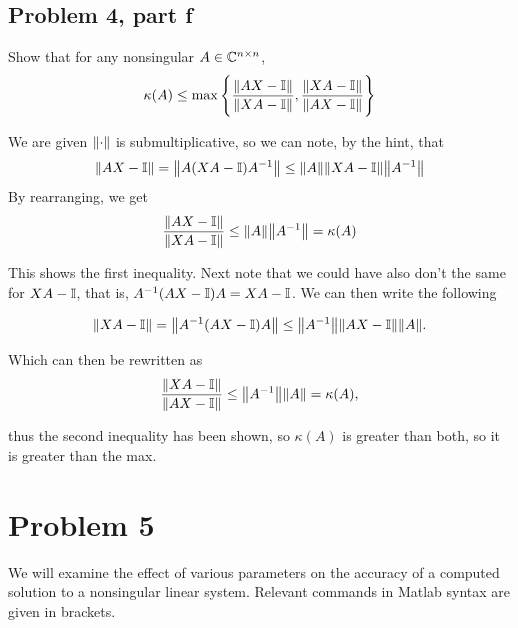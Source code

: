 \newpage
 \subsection{Problem 4, part f}
 Show that for any nonsingular $A \in \mathbb{C}^{n\times n}$, 
 \[
 \kappa(A) \leq \max \Bigg\{ \frac{\norm{AX - \mathbb{I}}}{\norm{XA - \mathbb{I}}}, \frac{\norm{XA - \mathbb{I}}}{\norm{AX - \mathbb{I}}} \Bigg\}
 \]
 \partbreak
 \begin{solution}

     We are given $\norm{\cdot}$ is submultiplicative, so we can note, by the hint, that
     \[
     \norm{AX - \mathbb{I}} = \norm{A(XA - \mathbb{I})A^{-1}} \leq \norm{A} \norm{XA- \mathbb{I}} \norm{A^{-1}}
     \]
     By rearranging, we get 
     \[
     \frac{\norm{AX - \mathbb{I}}}{\norm{XA - \mathbb{I}}} \leq \norm{A}\norm{A^{-1}} = \kappa(A)
     \]

     This shows the first inequality. Next note that we could have also don't the same for $XA - \mathbb{I}$, that is, $A^{-1}(AX - \mathbb{I}) A = XA - \mathbb{I}$. We can then write the following

     \[
     \norm{XA - \mathbb{I}} = \norm{A^{-1}(AX - \mathbb{I}) A} \leq \norm{A^{-1}}\norm{AX - \mathbb{I}}\norm{A}.
     \]

     Which can then be rewritten as 
     \[
     \frac{\norm{XA - \mathbb{I}}}{\norm{AX - \mathbb{I}}} \leq \norm{A^{-1}} \norm{A} = \kappa(A),
     \]

     thus the second inequality has been shown, so $\kappa(A)$ is greater than both, so it is greater than the max. 
 \end{solution}
\newpage
\section{Problem 5}
We will examine the effect of various parameters on the accuracy of a computed solution to a nonsingular linear system. Relevant commands in Matlab syntax are given in brackets.


